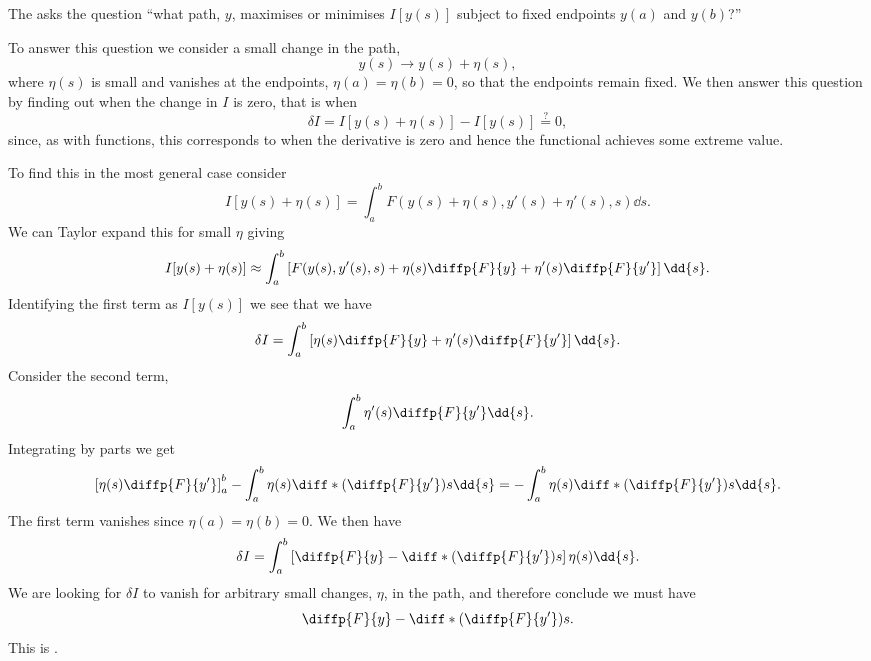 \documentclass[fleqn]{NotesClass}
\begin{document}
    The  asks the question \enquote{what path, \(y\), maximises or minimises \(I[y(s)]\) subject to fixed endpoints \(y(a)\) and \(y(b)\)?}
    
    To answer this question we consider a small change in the path,
    \begin{equation}
        y(s) \to y(s) + \eta (s),
    \end{equation}
    where \(\eta(s)\) is small and vanishes at the endpoints, \(\eta(a) = \eta(b) = 0\), so that the endpoints remain fixed.
    We then answer this question by finding out when the change in \(I\) is zero, that is when
    \begin{equation}
        \delta I = I[y(s) + \eta(s)] - I[y(s)] \stackrel{?}{=} 0,
    \end{equation}
    since, as with functions, this corresponds to when the derivative is zero and hence the functional achieves some extreme value.
    
    To find this in the most general case consider
    \begin{equation}
        I[y(s) + \eta(s)] = \int_a^b F(y(s) + \eta(s), y'(s) + \eta'(s), s) \dd{s}.
    \end{equation}
    We can Taylor expand this for small \(\eta\) giving
    \begin{equation}
        I[y(s) + \eta(s)] \approx \int_a^b \left[ F(y(s), y'(s), s) + \eta(s)\diffp{F}{y} + \eta'(s)\diffp{F}{y'} \right] \dd{s}.
    \end{equation}
    Identifying the first term as \(I[y(s)]\) we see that we have
    \begin{equation}
        \delta I = \int_a^b \left[ \eta(s)\diffp{F}{y} + \eta'(s)\diffp{F}{y'} \right]\dd{s}.
    \end{equation}
    Consider the second term,
    \begin{equation}
        \int_a^b \eta'(s) \diffp{F}{y'} \dd{s}.
    \end{equation}
    Integrating by parts we get
    \begin{equation}
        \left[ \eta(s) \diffp{F}{y'} \right]_a^b - \int_a^b \eta(s)\diff*{\left( \diffp{F}{y'} \right)}{s} \dd{s} = - \int_a^b \eta(s)\diff*{\left( \diffp{F}{y'} \right)}{s} \dd{s}.
    \end{equation}
    The first term vanishes since \(\eta(a) = \eta(b) = 0\).
    We then have
    \begin{equation}
        \delta I = \int_a^b \left[ \diffp{F}{y} - \diff*{\left( \diffp{F}{y'} \right)}{s} \right] \eta(s) \dd{s}.
    \end{equation}
    We are looking for \(\delta I\) to vanish for arbitrary small changes, \(\eta\), in the path, and therefore conclude we must have
    \begin{equation}
        \diffp{F}{y} - \diff*{\left( \diffp{F}{y'} \right)}{s}.
    \end{equation}
    This is .
    
\end{document}
